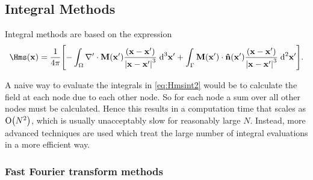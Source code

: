 \subsection{Integral Methods}
\label{sec:magstat-field-calc-inte}



Integral methods are based on the expression
\begin{equation}
  \Hms(\xv) = \frac{1}{4 \pi} \bigs{
    - \int_\magd \nabla' \cdot \Mv(\xv') \frac{(\xv - \xv')}{\abs{\xv -\xv'}^3} \d^3 \xv'
    + \int_\boundd \Mv(\xv') \cdot \nv(\xv') \frac{(\xv - \xv')}{\abs{\xv - \xv'}^3} \d^2 \xv' }.
  \label{eq:Hmsint2}
\end{equation}

A naive way to evaluate the integrals in \cref{eq:Hmsint2} would be to calculate the field at each node due to each other node.
So for each node a sum over all other nodes must be calculated.
Hence this results in a computation time that scales as $\mathrm{O}{\left( N^2 \right)}$, which is usually unacceptably slow for reasonably large $N$.
Instead, more advanced techniques are used which treat the large number of integral evaluations in a more efficient way.


\subsubsection{Fast Fourier transform methods}

